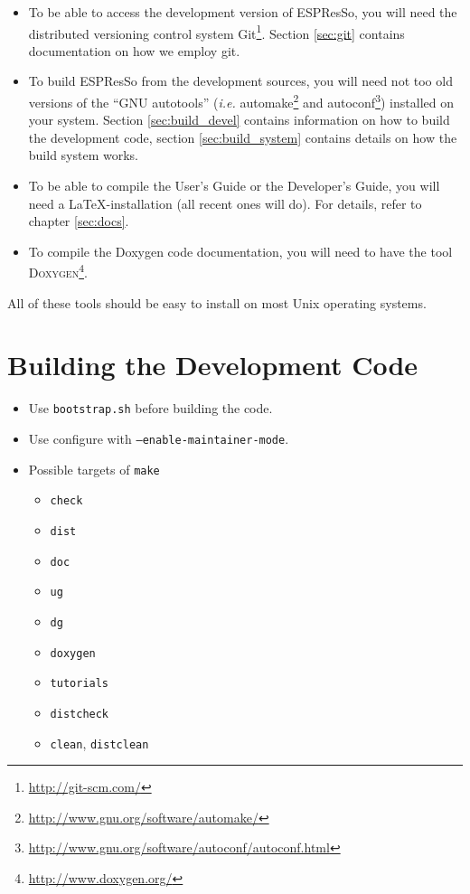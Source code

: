 \documentclass[
a4paper,                        %
11pt,                           %
twoside,                        %
footsepline,                    %
headsepline,                    %
headexclude,                    %
footexclude,                    %
pagesize,                       %
bibtotocnumbered,               %
idxtotoc                        %
]{scrreprt}
\newcommand{\es}{\mbox{\textsf{ESPResSo}}\xspace}
\newcommand{\ie}{\textit{i.e.}\xspace}
\begin{document}
\begin{itemize}
\item To be able to access the development version of \es, you will
  need the distributed versioning control system
  Git\footnote{\url{http://git-scm.com/}}.  Section \vref{sec:git}
  contains documentation on how we employ git.
\item To build \es from the development sources, you will need not too
  old versions of the ``GNU autotools'' (\ie
  automake\footnote{\url{http://www.gnu.org/software/automake/}} and
  autoconf\footnote{\url{http://www.gnu.org/software/autoconf/autoconf.html}})
  installed on your system. Section \vref{sec:build_devel} contains
  information on how to build the development code, section
  \vref{sec:build_system} contains details on how the build system
  works.
\item To be able to compile the User's Guide or the Developer's Guide,
  you will need a \LaTeX-installation (all recent ones will do). For
  details, refer to chapter \vref{sec:docs}.
\item To compile the Doxygen code documentation, you will need to have
  the tool \textsc{Doxygen}\footnote{\url{http://www.doxygen.org/}}.
\end{itemize}

All of these tools should be easy to install on most Unix operating
systems.

\section{Building the Development Code}
\label{sec:build_devel}

\begin{itemize}
\item Use \texttt{bootstrap.sh} before building the code.
\item Use configure with \texttt{--enable-maintainer-mode}.
\item Possible targets of \texttt{make}
  \begin{itemize}
  \item \texttt{check}
  \item \texttt{dist}
  \item \texttt{doc}
  \item \texttt{ug}
  \item \texttt{dg}
  \item \texttt{doxygen}
  \item \texttt{tutorials}
  \item \texttt{distcheck}
  \item \texttt{clean}, \texttt{distclean}
  \end{itemize}
\end{itemize}
\end{document}
